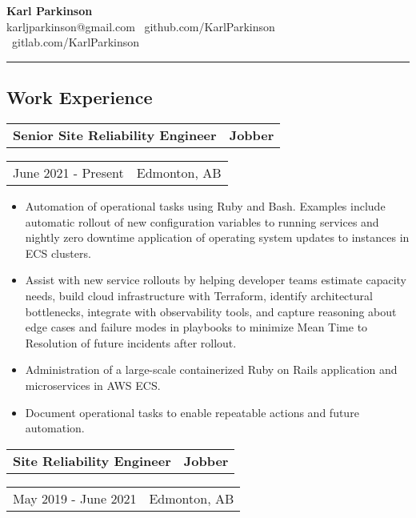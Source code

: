 \documentclass[10pt,letterpaper]{article}
\makeatletter
\newcommand{\headerrow}[2]
{\begin{tabular*}{\linewidth}{l@{\extracolsep{\fill}}r}
	#1 &
	#2 \\
\end{tabular*}}
\makeatother
\begin{document}
\begin{center}
{\LARGE \textbf{Karl Parkinson}}
\\
karljparkinson@gmail.com \textbullet \ github.com/KarlParkinson \textbullet \ gitlab.com/KarlParkinson

\end{center}

\hrule

\subsection*{Work Experience}
       \headerrow
       	        {\textbf{Senior Site Reliability Engineer}}
	        {\textbf{Jobber}}
	\headerrow
		{June 2021 - Present}
		{Edmonton, AB}
		
       \begin{itemize}
          \itemsep0em
                \item Automation of operational tasks using Ruby and Bash. Examples include automatic rollout of new configuration variables to running services and nightly zero downtime application of operating system updates to instances in ECS clusters.
                \item Assist with new service rollouts by helping developer teams estimate capacity needs, build cloud infrastructure with Terraform, identify architectural bottlenecks, integrate with observability tools, and capture reasoning about edge cases and failure modes in playbooks to minimize Mean Time to Resolution of future incidents after rollout.
                \item Administration of a large-scale containerized Ruby on Rails application and microservices in AWS ECS.
                \item Document operational tasks to enable repeatable actions and future automation.
        \end{itemize}
       \headerrow
       	        {\textbf{Site Reliability Engineer}}
	        {\textbf{Jobber}}
	\headerrow
		{May 2019 - June 2021}
		{Edmonton, AB}
		
\end{document}
